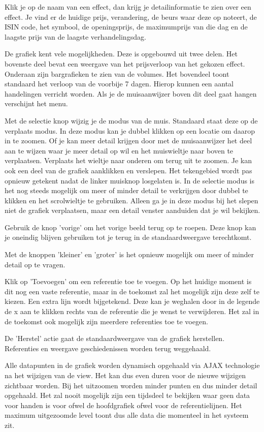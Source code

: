 Klik je op de naam van een effect, dan krijg je detailinformatie te zien over een effect.
Je vind er de huidige prijs, verandering, de beurs waar deze op noteert, de ISIN code, het symbool, de openingsprijs, de maximumprijs van die dag en de laagste prijs van de laagste verhandelingsdag.

De grafiek kent vele mogelijkheden.
Deze is opgebouwd uit twee delen. Het bovenste deel bevat een weergave van het prijsverloop van het gekozen effect. Onderaan zijn bargrafieken te zien van de volumes. Het bovendeel toont standaard het verloop van de voorbije 7 dagen. Hierop kunnen een aantal handelingen verricht worden.
Als je de muisaanwijzer boven dit deel gaat hangen verschijnt het menu.

Met de selectie knop wijzig je de modus van de muis. Standaard staat deze op de verplaats modus.
In deze modus kan je dubbel klikken op een locatie om daarop in te zoomen. Of je kan meer detail krijgen door met de muisaanwijzer het deel aan te wijzen waar je meer detail op wil en het muiswieltje naar boven te verplaatsen. Verplaats het wieltje naar onderen om terug uit te zoomen.
Je kan ook een deel van de grafiek aanklikken en verslepen. Het tekengebied wordt pas opnieuw getekent nadat de linker muisknop losgelaten is.
In de selectie modus is het nog steeds mogelijk om meer of minder detail te verkrijgen door dubbel te klikken en het scrolwieltje te gebruiken.
Alleen ga je in deze modus bij het slepen niet de grafiek verplaatsen, maar een detail venster aanduiden dat je wil bekijken.

Gebruik de knop 'vorige' om het vorige beeld terug op te roepen. Deze knop kan je oneindig blijven gebruiken tot je terug in de standaardweergave terechtkomt.

Met de knoppen 'kleiner' en 'groter' is het opnieuw mogelijk om meer of minder detail op te vragen.

Klik op 'Toevoegen' om een referentie toe te voegen. Op het huidige moment is dit nog een vaste referentie, maar in de toekomst zal het mogelijk zijn deze zelf te kiezen. Een extra lijn wordt bijgetekend. Deze kan je weghalen door in de legende de x aan te klikken rechts van de referentie die je wenst te verwijderen.
Het zal in de toekomst ook mogelijk zijn meerdere referenties toe te voegen.

De 'Herstel' actie gaat de standaardweergave van de grafiek herstellen. Referenties en weergave geschiedenissen worden terug weggehaald.

Alle datapunten in de grafiek worden dynamisch opgehaald via AJAX technologie na het wijzigen van de view. Het kan dus even duren voor de nieuwe wijzigen zichtbaar worden. Bij het uitzoomen worden minder punten en dus minder detail opgehaald. Het zal nooit mogelijk zijn een tijdsdeel te bekijken waar geen data voor handen is voor ofwel de hoofdgrafiek ofwel voor de referentielijnen. Het maximum uitgezoomde level toont dus alle data die momenteel in het systeem zit.

